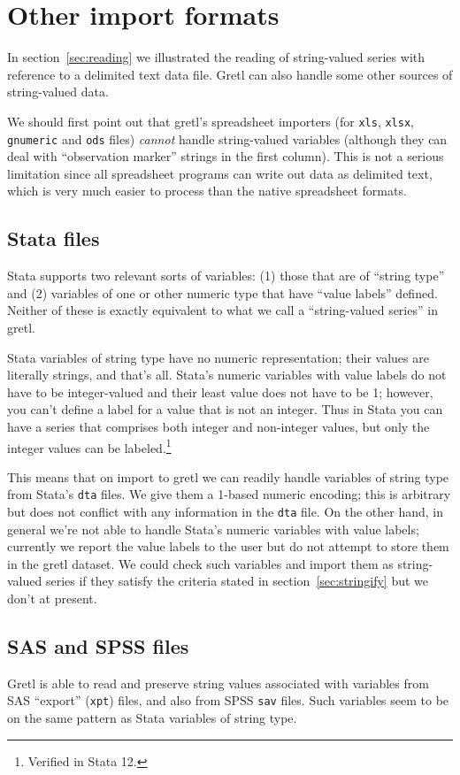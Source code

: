 \section{Other import formats}
\label{sec:other-imports}

In section~\ref{sec:reading} we illustrated the reading of
string-valued series with reference to a delimited text data
file. Gretl can also handle some other sources of string-valued data.

We should first point out that gretl's spreadsheet importers (for
\texttt{xls}, \texttt{xlsx}, \texttt{gnumeric} and \texttt{ods} files)
\textit{cannot} handle string-valued variables (although they can deal
with ``observation marker'' strings in the first column). This is not
a serious limitation since all spreadsheet programs can write out data
as delimited text, which is very much easier to process than the
native spreadsheet formats.

\subsection{Stata files}

Stata supports two relevant sorts of variables: (1) those that are of
``string type'' and (2) variables of one or other numeric type that
have ``value labels'' defined. Neither of these is exactly equivalent
to what we call a ``string-valued series'' in gretl.

Stata variables of string type have no numeric representation; their
values are literally strings, and that's all. Stata's numeric
variables with value labels do not have to be integer-valued and their
least value does not have to be 1; however, you can't define a label
for a value that is not an integer. Thus in Stata you can have a
series that comprises both integer and non-integer values, but only
the integer values can be labeled.\footnote{Verified in Stata 12.}

This means that on import to gretl we can readily handle variables of
string type from Stata's \texttt{dta} files. We give them a 1-based
numeric encoding; this is arbitrary but does not conflict with any
information in the \texttt{dta} file. On the other hand, in general
we're not able to handle Stata's numeric variables with value labels;
currently we report the value labels to the user but do not attempt to
store them in the gretl dataset. We could check such variables and
import them as string-valued series if they satisfy the criteria
stated in section~\ref{sec:stringify} but we don't at present.

\subsection{SAS and SPSS files}

Gretl is able to read and preserve string values associated with
variables from SAS ``export'' (\texttt{xpt}) files, and also from SPSS
\texttt{sav} files. Such variables seem to be on the same pattern as
Stata variables of string type.


